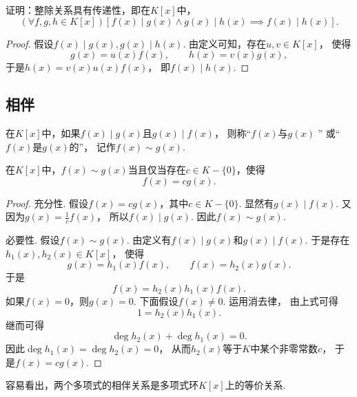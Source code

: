 \begin{example}
证明：整除关系具有传递性，即在\(K[x]\)中，\[
	(\forall f,g,h \in K[x])
	[
		f(x) \mid g(x) \land g(x) \mid h(x)
		\implies
		f(x) \mid h(x)
	].
\]
\begin{proof}
假设\(f(x) \mid g(x), g(x) \mid h(x)\).
由定义可知，存在\(u,v \in K[x]\)，
使得\[
	g(x) = u(x) f(x), \qquad
	h(x) = v(x) g(x),
\]
于是\(h(x) = v(x) u(x) f(x)\)，
即\(f(x) \mid h(x)\).
\end{proof}
\end{example}

\subsection{相伴}
\begin{definition}
在\(K[x]\)中，如果\(f(x) \mid g(x)\)且\(g(x) \mid f(x)\)，
则称“\(f(x)\)与\(g(x)\) ”
或“\(f(x)\)是\(g(x)\)的”，
记作\(f(x) \sim g(x)\).
\end{definition}

\begin{proposition}
在\(K[x]\)中，\(f(x) \sim g(x)\)当且仅当存在\(c \in K-\{0\}\)，使得\[
	f(x) = c g(x).
\]
\begin{proof}
充分性.
假设\(f(x)=c g(x)\)，其中\(c \in K-\{0\}\).
显然有\(g(x) \mid f(x)\).
又因为\(g(x)=\frac1c f(x)\)，
所以\(f(x) \mid g(x)\).
因此\(f(x) \sim g(x)\).

必要性.
假设\(f(x) \sim g(x)\).
由定义有\(f(x) \mid g(x)\)和\(g(x) \mid f(x)\).
于是存在\(h_1(x),h_2(x) \in K[x]\)，
使得\[
	g(x) = h_1(x) f(x), \qquad
	f(x) = h_2(x) g(x).
\]
于是\[
	f(x) = h_2(x) h_1(x) f(x).
\]
如果\(f(x)=0\)，则\(g(x)=0\).
下面假设\(f(x)\neq0\).
运用消去律，
由上式可得\[
	1 = h_2(x) h_1(x).
\]
继而可得\[
	\deg h_2(x) + \deg h_1(x) = 0.
\]
因此\(\deg h_1(x) = \deg h_2(x) = 0\)，
从而\(h_2(x)\)等于\(K\)中某个非零常数\(c\)，
于是\(f(x) = c g(x)\).
\end{proof}
\end{proposition}

容易看出，两个多项式的相伴关系是多项式环\(K[x]\)上的等价关系.

